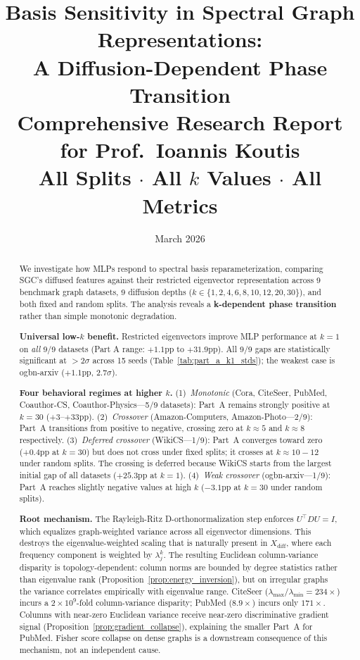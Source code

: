 \documentclass[11pt]{article}
\title{\textbf{Basis Sensitivity in Spectral Graph Representations:\\
A Diffusion-Dependent Phase Transition}\\[0.5em]
\large Comprehensive Research Report for Prof.\ Ioannis Koutis\\
All Splits $\cdot$ All $k$ Values $\cdot$ All Metrics}
\author{}
\date{March 2026}
\begin{document}
\maketitle
\tableofcontents
\clearpage

\begin{abstract}
We investigate how MLPs respond to spectral basis reparameterization, comparing SGC's
diffused features against their restricted eigenvector representation across 9 benchmark
graph datasets, 9 diffusion depths ($k \in \{1,2,4,6,8,10,12,20,30\}$), and both fixed
and random splits.  The analysis reveals a \textbf{k-dependent phase transition} rather
than simple monotonic degradation.

\textbf{Universal low-$k$ benefit.}
Restricted eigenvectors improve MLP performance at $k{=}1$ on \emph{all} 9/9
datasets (Part A range: $+1.1$pp to $+31.9$pp).
All 9/9 gaps are statistically significant at ${>}2\sigma$ across 15 seeds
(Table~\ref{tab:part_a_k1_stds}); the weakest case is ogbn-arxiv
($+1.1$pp, $2.7\sigma$).

\textbf{Four behavioral regimes at higher $k$.}
(1)~\textit{Monotonic} (Cora, CiteSeer, PubMed, Coauthor-CS, Coauthor-Physics—5/9
datasets): Part~A remains strongly positive at $k{=}30$ ($+3$--$+33$pp).
(2)~\textit{Crossover} (Amazon-Computers, Amazon-Photo—2/9): Part~A transitions
from positive to negative, crossing zero at $k{\approx}5$ and $k{\approx}8$ respectively.
(3)~\textit{Deferred crossover} (WikiCS—1/9): Part~A converges toward zero
(+0.4pp at $k{=}30$) but does not cross under fixed splits; it crosses at
$k{\approx}10{-}12$ under random splits.  The crossing is deferred because
WikiCS starts from the largest initial gap of all datasets ($+25.3$pp at $k{=}1$).
(4)~\textit{Weak crossover} (ogbn-arxiv—1/9): Part~A reaches slightly negative
values at high $k$ ($-3.1$pp at $k{=}30$ under random splits).

\textbf{Root mechanism.}
The Rayleigh-Ritz D-orthonormalization step enforces $U^\top D U = I$, which
equalizes graph-weighted variance across all eigenvector dimensions.  This destroys
the eigenvalue-weighted scaling that is naturally present in $X_{\mathrm{diff}}$,
where each frequency component is weighted by $\lambda_j^k$.  The resulting Euclidean column-variance disparity is topology-dependent: column
norms are bounded by degree statistics rather than eigenvalue rank
(Proposition~\ref{prop:energy_inversion}), but on irregular graphs the variance
correlates empirically with eigenvalue range.
CiteSeer ($\lambda_{\max}/\lambda_{\min} = 234\times$) incurs a
$2{\times}10^9$-fold column-variance disparity; PubMed ($8.9\times$) incurs only
$171\times$.  Columns with near-zero Euclidean variance receive near-zero
discriminative gradient signal (Proposition~\ref{prop:gradient_collapse}),
explaining the smaller Part~A for PubMed.  Fisher score collapse on dense graphs
is a downstream consequence of this mechanism, not an independent cause.


\end{abstract}
\end{document}
